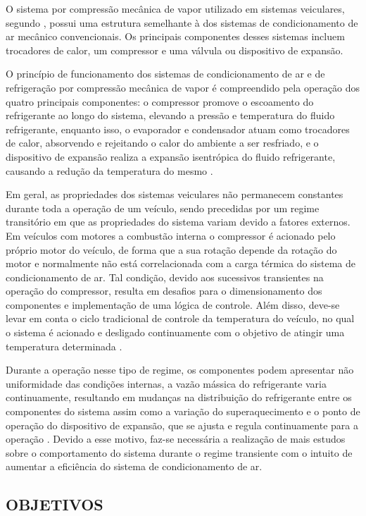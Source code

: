 O sistema por compressão mecânica de vapor utilizado em sistemas veiculares, segundo  \textcite{dasilva2016}, possui uma estrutura semelhante à dos sistemas de condicionamento de ar mecânico convencionais. Os principais componentes desses sistemas incluem trocadores de calor, um compressor e uma válvula ou dispositivo de expansão.

O princípio de funcionamento dos sistemas de condicionamento de ar e de refrigeração por compressão mecânica de vapor é compreendido pela operação dos quatro principais componentes: o compressor promove o escoamento do refrigerante ao longo do sistema, elevando a pressão e temperatura do fluido refrigerante, enquanto isso, o evaporador e condensador atuam como trocadores de calor, absorvendo e rejeitando o calor do ambiente a ser resfriado, e o dispositivo de expansão realiza a expansão isentrópica do fluido refrigerante, causando a redução da temperatura do mesmo \cite{junior2023}.

Em geral, as propriedades dos sistemas veiculares não permanecem constantes durante toda a operação de um veículo, sendo precedidas por um regime transitório em que as propriedades do sistema variam devido a fatores externos. Em veículos com motores a combustão interna o compressor é acionado pelo próprio motor do veículo, de forma que a sua rotação depende da rotação do motor e normalmente não está correlacionada com a carga térmica do sistema de condicionamento de ar. Tal condição, devido aos sucessivos transientes na operação do compressor, resulta em desafios para o dimensionamento dos componentes e implementação de uma lógica de controle. Além disso, deve-se levar em conta o ciclo tradicional de controle da temperatura do veículo, no qual o sistema é acionado e desligado continuamente com o objetivo de atingir uma temperatura determinada \cite{juliani2017}.

Durante a operação nesse tipo de regime, os componentes podem apresentar não uniformidade das condições internas, a vazão mássica do refrigerante varia continuamente, resultando em mudanças na distribuição do refrigerante entre os componentes do sistema assim como a variação do superaquecimento e o ponto de operação do dispositivo de expansão, que se ajusta e regula continuamente para a operação \cite{rangel2007}. Devido a esse motivo, faz-se necessária a realização de mais estudos sobre o comportamento do sistema durante o regime transiente com o intuito de aumentar a eficiência do sistema de condicionamento de ar.

\subsection{OBJETIVOS}

